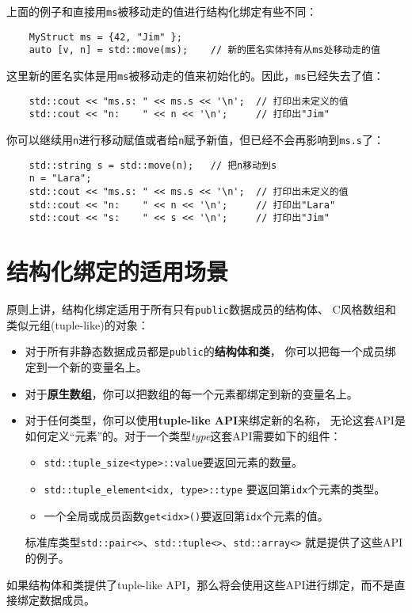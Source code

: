 上面的例子和直接用\texttt{ms}被移动走的值进行结构化绑定有些不同：
\begin{lstlisting}
    MyStruct ms = {42, "Jim" };
    auto [v, n] = std::move(ms);    // 新的匿名实体持有从ms处移动走的值
\end{lstlisting}
这里新的匿名实体是用\texttt{ms}被移动走的值来初始化的。因此，\texttt{ms}已经失去了值：
\begin{lstlisting}
    std::cout << "ms.s: " << ms.s << '\n';  // 打印出未定义的值
    std::cout << "n:    " << n << '\n';     // 打印出"Jim"
\end{lstlisting}
你可以继续用\texttt{n}进行移动赋值或者给\texttt{n}赋予新值，但已经不会再影响到\texttt{ms.s}了：
\begin{lstlisting}
    std::string s = std::move(n);   // 把n移动到s
    n = "Lara";
    std::cout << "ms.s: " << ms.s << '\n';  // 打印出未定义的值
    std::cout << "n:    " << n << '\n';     // 打印出"Lara"
    std::cout << "s:    " << s << '\n';     // 打印出"Jim"
\end{lstlisting}

\section{结构化绑定的适用场景}
原则上讲，结构化绑定适用于所有只有\texttt{public}数据成员的结构体、
C风格数组和类似元组(tuple-like)的对象：
\begin{itemize}
    \item 对于所有非静态数据成员都是\texttt{public}的\textbf{结构体和类}，
    你可以把每一个成员绑定到一个新的变量名上。
    \item 对于\textbf{原生数组}，你可以把数组的每一个元素都绑定到新的变量名上。
    \item 对于任何类型，你可以使用\textbf{tuple-like API}来绑定新的名称，
    无论这套API是如何定义“元素”的。对于一个类型\emph{type}这套API需要如下的组件：
    \begin{itemize}
        \item \texttt{std::tuple\_size<type>::value}要返回元素的数量。
        \item \texttt{std::tuple\_element<idx, type>::type}
        要返回第\texttt{idx}个元素的类型。
        \item 一个全局或成员函数\texttt{get<idx>()}要返回第\texttt{idx}个元素的值。
    \end{itemize}
    标准库类型\texttt{std::pair<>}、\texttt{std::tuple<>}、\texttt{std::array<>}
    就是提供了这些API的例子。
\end{itemize}
如果结构体和类提供了tuple-like API，那么将会使用这些API进行绑定，而不是直接绑定数据成员。

